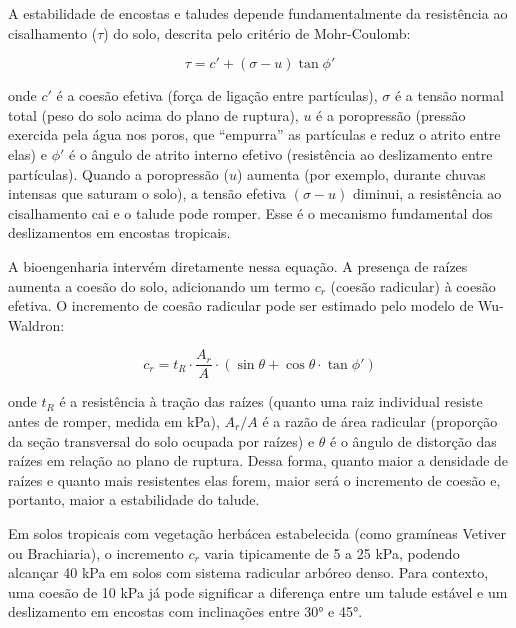 \documentclass[
  portuguese,
  11pt,
  a4paper,
  open=any]{scrbook}
\begin{document}
A estabilidade de encostas e taludes depende fundamentalmente da
resistência ao cisalhamento (\(\tau\)) do solo, descrita pelo critério
de Mohr-Coulomb:

\[
\tau = c' + (\sigma - u) \tan \phi'
\]

onde \(c'\) é a coesão efetiva (força de ligação entre partículas),
\(\sigma\) é a tensão normal total (peso do solo acima do plano de
ruptura), \(u\) é a poropressão (pressão exercida pela água nos poros,
que ``empurra'' as partículas e reduz o atrito entre elas) e \(\phi'\) é
o ângulo de atrito interno efetivo (resistência ao deslizamento entre
partículas). Quando a poropressão (\(u\)) aumenta (por exemplo, durante
chuvas intensas que saturam o solo), a tensão efetiva \((\sigma - u)\)
diminui, a resistência ao cisalhamento cai e o talude pode romper. Esse
é o mecanismo fundamental dos deslizamentos em encostas tropicais.

A bioengenharia intervém diretamente nessa equação. A presença de raízes
aumenta a coesão do solo, adicionando um termo \(c_r\) (coesão
radicular) à coesão efetiva. O incremento de coesão radicular pode ser
estimado pelo modelo de Wu-Waldron:

\[
c_r = t_R \cdot \frac{A_r}{A} \cdot (\sin \theta + \cos \theta \cdot \tan \phi')
\]

onde \(t_R\) é a resistência à tração das raízes (quanto uma raiz
individual resiste antes de romper, medida em kPa), \(A_r/A\) é a razão
de área radicular (proporção da seção transversal do solo ocupada por
raízes) e \(\theta\) é o ângulo de distorção das raízes em relação ao
plano de ruptura. Dessa forma, quanto maior a densidade de raízes e
quanto mais resistentes elas forem, maior será o incremento de coesão e,
portanto, maior a estabilidade do talude.

\begin{tcolorbox}[enhanced jigsaw, leftrule=.75mm, colframe=quarto-callout-tip-color-frame, colback=white, bottomrule=.15mm, opacityback=0, colbacktitle=quarto-callout-tip-color!10!white, breakable, bottomtitle=1mm, opacitybacktitle=0.6, title=\textcolor{quarto-callout-tip-color}{\faLightbulb}\hspace{0.5em}{Valores típicos}, titlerule=0mm, toprule=.15mm, toptitle=1mm, rightrule=.15mm, left=2mm, arc=.35mm, coltitle=black]

Em solos tropicais com vegetação herbácea estabelecida (como gramíneas
Vetiver ou Brachiaria), o incremento \(c_r\) varia tipicamente de 5 a 25
kPa, podendo alcançar 40 kPa em solos com sistema radicular arbóreo
denso. Para contexto, uma coesão de 10 kPa já pode significar a
diferença entre um talude estável e um deslizamento em encostas com
inclinações entre 30° e 45°.

\end{tcolorbox}
\end{document}
